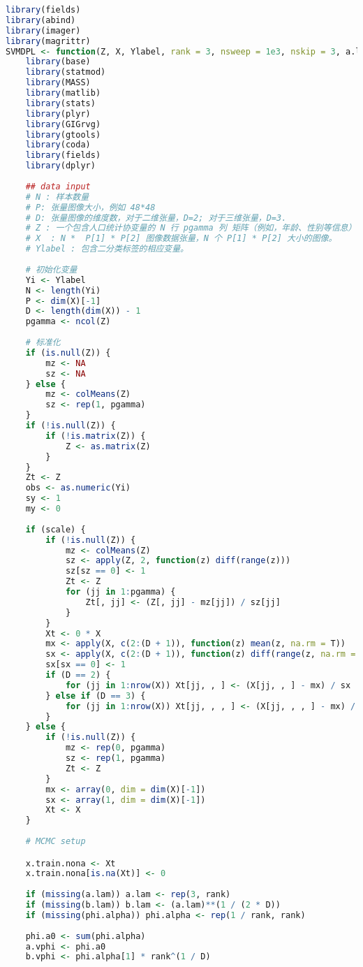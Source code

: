 \documentclass[AutoFakeBold]{LZUThesis}
\begin{document}
\printbib

\Appendix

\begin{lstlisting}[language=R, caption = {BT-SVM}算法]
library(fields)
library(abind)
library(imager)
library(magrittr)
SVMDPL <- function(Z, X, Ylabel, rank = 3, nsweep = 1e3, nskip = 3, a.lam, b.lam, phi.alpha, scale = TRUE) {
	library(base)
	library(statmod)
	library(MASS)
	library(matlib)
	library(stats)
	library(plyr)
	library(GIGrvg)
	library(gtools)
	library(coda)
	library(fields)
	library(dplyr)
	
	## data input
	# N : 样本数量
	# P: 张量图像大小，例如 48*48
	# D: 张量图像的维度数，对于二维张量，D=2; 对于三维张量，D=3.
	# Z : 一个包含人口统计协变量的 N 行 pgamma 列 矩阵（例如，年龄、性别等信息） pgamma是协变量的数量。
	# X  : N *  P[1] * P[2] 图像数据张量，N 个 P[1] * P[2] 大小的图像。
	# Ylabel : 包含二分类标签的相应变量。
	
	# 初始化变量 
	Yi <- Ylabel
	N <- length(Yi)
	P <- dim(X)[-1]
	D <- length(dim(X)) - 1
	pgamma <- ncol(Z)
	
	# 标准化
	if (is.null(Z)) {
		mz <- NA
		sz <- NA
	} else {
		mz <- colMeans(Z)
		sz <- rep(1, pgamma)
	}
	if (!is.null(Z)) {
		if (!is.matrix(Z)) {
			Z <- as.matrix(Z)
		}
	}
	Zt <- Z
	obs <- as.numeric(Yi)
	sy <- 1
	my <- 0
	
	if (scale) {
		if (!is.null(Z)) {
			mz <- colMeans(Z)
			sz <- apply(Z, 2, function(z) diff(range(z)))
			sz[sz == 0] <- 1
			Zt <- Z
			for (jj in 1:pgamma) {
				Zt[, jj] <- (Z[, jj] - mz[jj]) / sz[jj]
			}
		}
		Xt <- 0 * X
		mx <- apply(X, c(2:(D + 1)), function(z) mean(z, na.rm = T))
		sx <- apply(X, c(2:(D + 1)), function(z) diff(range(z, na.rm = T)))
		sx[sx == 0] <- 1
		if (D == 2) {
			for (jj in 1:nrow(X)) Xt[jj, , ] <- (X[jj, , ] - mx) / sx
		} else if (D == 3) {
			for (jj in 1:nrow(X)) Xt[jj, , , ] <- (X[jj, , , ] - mx) / sx
		}
	} else {
		if (!is.null(Z)) {
			mz <- rep(0, pgamma)
			sz <- rep(1, pgamma)
			Zt <- Z
		}
		mx <- array(0, dim = dim(X)[-1])
		sx <- array(1, dim = dim(X)[-1])
		Xt <- X
	}
	
	# MCMC setup

	x.train.nona <- Xt
	x.train.nona[is.na(Xt)] <- 0
	
	if (missing(a.lam)) a.lam <- rep(3, rank)
	if (missing(b.lam)) b.lam <- (a.lam)**(1 / (2 * D))
	if (missing(phi.alpha)) phi.alpha <- rep(1 / rank, rank)
	
	phi.a0 <- sum(phi.alpha)
	a.vphi <- phi.a0
	b.vphi <- phi.alpha[1] * rank^(1 / D)
	

\end{lstlisting}
\end{document}
